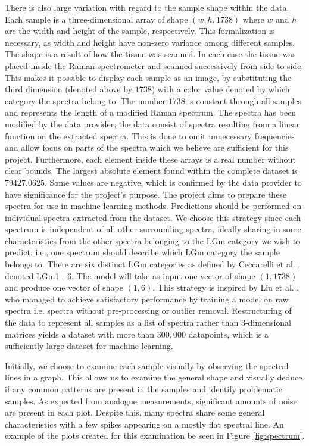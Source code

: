 There is also large variation with regard to the sample shape within the data. Each sample is a three-dimensional array of shape $(w, h, 1738)$ where $w$ and $h$ are the width and height of the sample, respectively. This formalization is necessary, as width and height have non-zero variance among different samples. The shape is a result of how the tissue was scanned. In each case the tissue was placed inside the Raman spectrometer and scanned successively from side to side. This makes it possible to display each sample as an image, by substituting the third dimension (denoted above by $1738$) with a color value denoted by which category the spectra belong to. The number $1738$ is constant through all samples and represents the length of a modified Raman spectrum. The spectra has been modified by the data provider; the data consist of spectra resulting from a linear function on the extracted spectra. This is done to omit unnecessary frequencies and allow focus on parts of the spectra which we believe are sufficient for this project. Furthermore, each element inside these arrays is a real number without clear bounds. The largest absolute element found within the complete dataset is $79427.0625$. Some values are negative, which is confirmed by the data provider to have significance for the project's purpose. The project aims to prepare these spectra for use in machine learning methods. Predictions should be performed on individual spectra extracted from the dataset. We choose this strategy since each spectrum is independent of all other surrounding spectra, ideally sharing in some characteristics from the other spectra belonging to the LGm category we wish to predict, i.e., one spectrum should describe which LGm category the sample belongs to. There are six distinct LGm categories as defined by Ceccarelli et al. \cite{cellsubsets}, denoted LGm1 - 6. The model will take as input one vector of shape $(1, 1738)$ and produce one vector of shape $(1, 6)$. This strategy is inspired by Liu et al. \cite{liu2017deep}, who managed to achieve satisfactory performance by training a model on raw spectra i.e. spectra without pre-processing or outlier removal. Restructuring of the data to represent all samples as a list of spectra rather than 3-dimensional matrices yields a dataset with more than $300,000$ datapoints, which is a sufficiently large dataset for machine learning.

Initially, we choose to examine each sample visually by observing the spectral lines in a graph. This allows us to examine the general shape and visually deduce if any common patterns are present in the samples and identify problematic samples. As expected from analogue measurements, significant amounts of noise are present in each plot. Despite this, many spectra share some general characteristics with a few spikes appearing on a mostly flat spectral line. An example of the plots created for this examination be seen in Figure \ref{fig:spectrum}.

